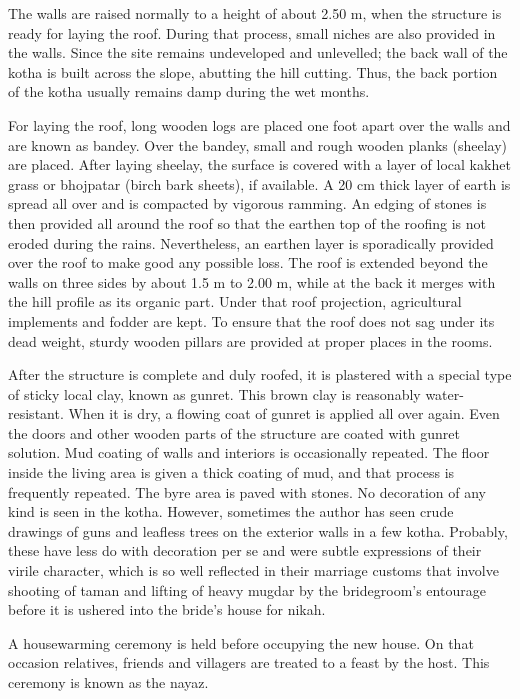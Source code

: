 The walls are raised normally to a height of about 2.50 m, when the structure is ready for laying the roof. During that process, small niches are also provided in the walls. Since the site remains undeveloped and unlevelled; the back wall of the kotha is built across the slope, abutting the hill cutting. Thus, the back portion of the kotha usually remains damp during the wet months.

For laying the roof, long wooden logs are placed one foot apart over the walls and are known as bandey. Over the bandey, small and rough wooden planks (sheelay) are placed. After laying sheelay, the surface is covered with a layer of local kakhet grass or bhojpatar (birch bark sheets), if available. A 20 cm thick layer of earth is spread all over and is compacted by vigorous ramming. An edging of stones is then provided all around the roof so that the earthen top of the roofing is not eroded during the rains. Nevertheless, an earthen layer is sporadically provided over the roof to make good any possible loss. The roof is extended beyond the walls on three sides by about 1.5 m to 2.00 m, while at the back it merges with the hill profile as its organic part. Under that roof projection, agricultural implements and fodder are kept. To ensure that the roof does not sag under its dead weight, sturdy wooden pillars are provided at proper places in the rooms.

After the structure is complete and duly roofed, it is plastered with a special type of sticky local clay, known as gunret. This brown clay is reasonably water-resistant. When it is dry, a flowing coat of gunret is applied all over again. Even the doors and other wooden parts of the structure are coated with gunret solution. Mud coating of walls and interiors is occasionally repeated. The floor inside the living area is given a thick coating of mud, and that process is frequently repeated. The byre area is paved with stones. No decoration of any kind is seen in the kotha. However, sometimes the author has seen crude drawings of guns and leafless trees on the exterior walls in a few kotha. Probably, these have less do with decoration per se and were subtle expressions of their virile character, which is so well reflected in their marriage customs that involve shooting of taman and lifting of heavy mugdar by the bridegroom’s entourage before it is ushered into the bride’s house for nikah.

A housewarming ceremony is held before occupying the new house. On that occasion relatives, friends and villagers are treated to a feast by the host. This ceremony is known as the nayaz.


